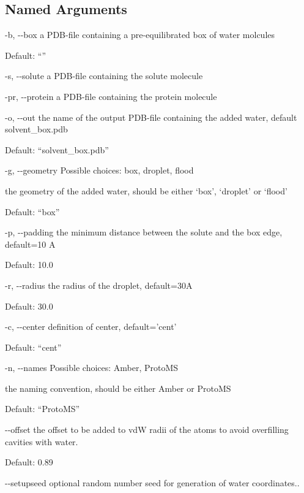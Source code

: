 \documentclass[letterpaper,10pt,english]{sphinxmanual}
\begin{document}
\subsection{Named Arguments}
\label{\detokenize{tools:Named Arguments}}\begin{optionlist}{3cm}
\item [-b, -{-}box]  
a PDB-file containing a pre-equilibrated box of water molcules

Default: “”
\item [-s, -{-}solute]  
a PDB-file containing the solute molecule
\item [-pr, -{-}protein]  
a PDB-file containing the protein molecule
\item [-o, -{-}out]  
the name of the output PDB-file containing the added water, default solvent\_box.pdb

Default: “solvent\_box.pdb”
\item [-g, -{-}geometry]  
Possible choices: box, droplet, flood

the geometry of the added water, should be either ‘box’, ‘droplet’ or ‘flood’

Default: “box”
\item [-p, -{-}padding]  
the minimum distance between the solute and the box edge, default=10 A

Default: 10.0
\item [-r, -{-}radius]  
the radius of the droplet, default=30A

Default: 30.0
\item [-c, -{-}center]  
definition of center, default=’cent’

Default: “cent”
\item [-n, -{-}names]  
Possible choices: Amber, ProtoMS

the naming convention, should be either Amber or ProtoMS

Default: “ProtoMS”
\item [-{-}offset]  
the offset to be added to vdW radii of the atoms to avoid overfilling cavities with water.

Default: 0.89
\item [-{-}setupseed]  
optional random number seed for generation of water coordinates..
\end{optionlist}
\end{document}
